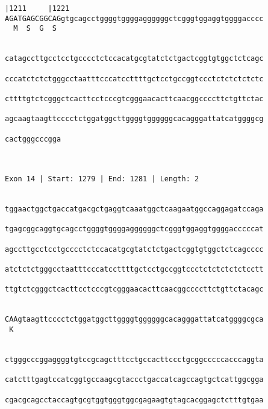 \documentclass{article}
\begin{document}
\begin{Verbatim}
|1211     |1221                                             
AGATGAGCGGCAGgtgcagcctggggtggggaggggggctcgggtggaggtggggacccc
  M  S  G  S                                                
                                                            
  
catagccttgcctcctgcccctctccacatgcgtatctctgactcggtgtggctctcagc
                                                            
cccatctctctgggcctaatttcccatccttttgctcctgccggtccctctctctctctc
                                                            
cttttgtctcgggctcacttcctcccgtcgggaacacttcaacggccccttctgttctac
                                                            
agcaagtaagttcccctctggatggcttggggtggggggcacagggattatcatggggcg
                                                            
cactgggcccgga
             
             
 
Exon 14 | Start: 1279 | End: 1281 | Length: 2


tggaactggctgaccatgacgctgaggtcaaatggctcaagaatggccaggagatccaga
                                                            
tgagcggcaggtgcagcctggggtggggaggggggctcgggtggaggtggggacccccat
                                                            
agccttgcctcctgcccctctccacatgcgtatctctgactcggtgtggctctcagcccc
                                                            
atctctctgggcctaatttcccatccttttgctcctgccggtccctctctctctctcctt
                                                            
ttgtctcgggctcacttcctcccgtcgggaacacttcaacggccccttctgttctacagc
                                                            
                                                            
CAAgtaagttcccctctggatggcttggggtggggggcacagggattatcatggggcgca
 K                                                          
                                                            
  
ctgggcccggaggggtgtccgcagctttcctgccacttccctgcggcccccacccaggta
                                                            
catctttgagtccatcggtgccaagcgtaccctgaccatcagccagtgctcattggcgga
                                                            
cgacgcagcctaccagtgcgtggtgggtggcgagaagtgtagcacggagctctttgtgaa
                                                            

\end{Verbatim}
\end{document}
